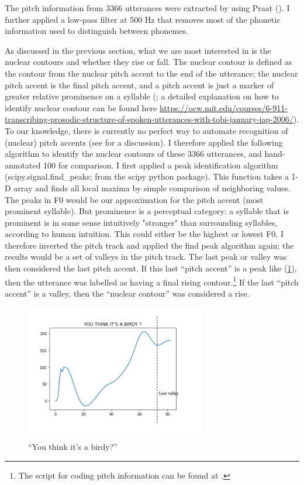 The pitch information from 3366 utterances were extracted by using Praat (\citealt{praat}). I further applied a low-pass filter at 500 Hz that removes most of the phonetic information used to distinguish between phonemes. 

As discussed in the previous section, what we are most interested in is the nuclear contours and whether they rise or fall. The nuclear contour is defined as the contour from the nuclear pitch accent to the end of the utterance; the nuclear pitch accent is the final pitch accent, and a pitch accent is just a marker of greater relative prominence on a syllable (\cite{buring2016intonation}; a detailed explanation on how to identify nuclear contour can be found here \url{https://ocw.mit.edu/courses/6-911-transcribing-prosodic-structure-of-spoken-utterances-with-tobi-january-iap-2006/}). To our knowledge, there is currently no perfect way to automate recognition of (nuclear) pitch accents (see \cite{buring2016intonation} for a discussion). I therefore applied the following algorithm to identify the nuclear contours of these 3366 utterances, and hand-annotated 100 for comparison. I first applied a peak identification algorithm (\textsf{scipy.signal.find\_peaks}; from the scipy python package). This function takes a 1-D array and finds all local maxima by simple comparison of neighboring values. The peaks in F0 would be our approximation for the pitch accent (most prominent syllable). But prominence is a perceptual category: a syllable that is prominent is in some sense intuitively "stronger" than surrounding syllables, according to human intuition. This could either be the highest or lowest F0. I therefore inverted the pitch track and applied the find peak algorithm again; the results would be a set of valleys in the pitch track. The last peak or valley was then considered the last pitch accent. If this last ``pitch accent'' is a peak like (\ref{fig:rise-example}), then the utterance was labelled as having a final rising contour.\footnote{The script for coding pitch information can be found at \mycode{}.} If the last ``pitch accent'' is a valley, then the ``nuclear contour'' was considered a rise. 

 
\begin{figure}[H]
    \centering
    \includegraphics[width=0.7\textwidth]{figures/pitch-rise.jpg}
    \caption{``You think it's a birdy?''}
    \label{fig:rise-example}
\end{figure}


